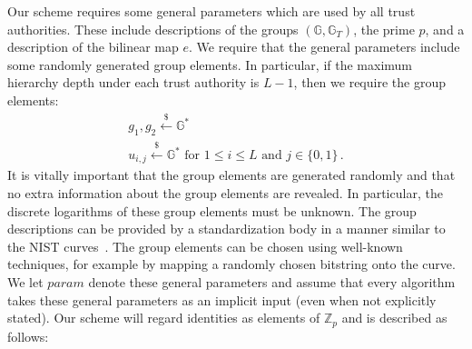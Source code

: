 \documentclass{IEEEtran}
\newcommand{\Gbb}{\mathbb{G}}
\newcommand{\Zbb}{\mathbb{Z}}
\newcommand{\param}{\mathit{param}}
\newcommand{\getsr}{\stackrel{{\scriptscriptstyle\$}}{\gets}}
\begin{document}
Our scheme requires some general parameters which are used by all
trust authorities. These include descriptions of the groups
$(\Gbb,\Gbb_{T})$, the prime $p$, and a description of the bilinear
map $e$. We require that the general parameters include some
randomly generated group elements. In particular, if the maximum
hierarchy depth under each trust authority is $L-1$, then we require
the group elements:
\begin{displaymath}
\begin{array}{c}
g_{1}, g_{2} \getsr \Gbb^{*} \\
u_{i,j} \getsr \Gbb^{*} \mbox{ for } 1\leq i\leq L \mbox{ and } j\in \{0,1\} \, .
\end{array}
\end{displaymath}
It is vitally important that the group elements are generated
randomly and that no extra information about the group elements are
revealed. In particular, the discrete logarithms of these group
elements must be unknown. The group descriptions can be provided by
a standardization body in a manner similar to the NIST
curves~\cite{NISTcurves}. The group elements can be chosen using
well-known techniques, for example by mapping a randomly chosen
bitstring onto the curve. We let $\param$ denote these general
parameters and assume that every algorithm takes these general
parameters as an implicit input (even when not explicitly stated).
Our scheme will regard identities as elements of $\Zbb_{p}$ and is
described as follows:
\end{document}
